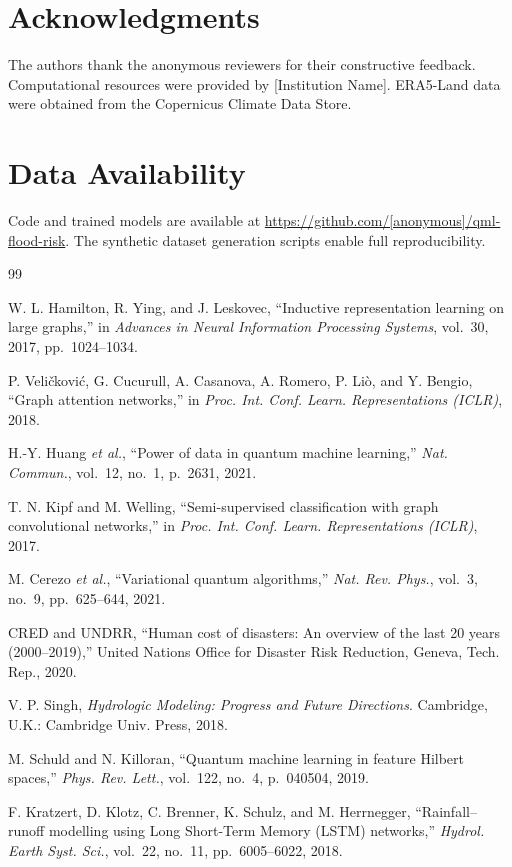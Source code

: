 \documentclass[conference]{IEEEtran}
\begin{document}
\section*{Acknowledgments}
The authors thank the anonymous reviewers for their constructive feedback. Computational resources were provided by [Institution Name]. ERA5-Land data were obtained from the Copernicus Climate Data Store.

\section*{Data Availability}
Code and trained models are available at \url{https://github.com/[anonymous]/qml-flood-risk}. The synthetic dataset generation scripts enable full reproducibility.

\begin{thebibliography}{99}

 W. L. Hamilton, R. Ying, and J. Leskovec, ``Inductive representation learning on large graphs,'' in \textit{Advances in Neural Information Processing Systems}, vol.~30, 2017, pp.~1024--1034.

 P. Veli\v{c}kovi\'{c}, G. Cucurull, A. Casanova, A. Romero, P. Li\`{o}, and Y. Bengio, ``Graph attention networks,'' in \textit{Proc. Int. Conf. Learn. Representations (ICLR)}, 2018.

 H.-Y. Huang \textit{et al.}, ``Power of data in quantum machine learning,'' \textit{Nat. Commun.}, vol.~12, no.~1, p.~2631, 2021.

 T. N. Kipf and M. Welling, ``Semi-supervised classification with graph convolutional networks,'' in \textit{Proc. Int. Conf. Learn. Representations (ICLR)}, 2017.

 M. Cerezo \textit{et al.}, ``Variational quantum algorithms,'' \textit{Nat. Rev. Phys.}, vol.~3, no.~9, pp.~625--644, 2021.

 CRED and UNDRR, ``Human cost of disasters: An overview of the last 20 years (2000--2019),'' United Nations Office for Disaster Risk Reduction, Geneva, Tech. Rep., 2020.

 V. P. Singh, \textit{Hydrologic Modeling: Progress and Future Directions}. Cambridge, U.K.: Cambridge Univ. Press, 2018.

 M. Schuld and N. Killoran, ``Quantum machine learning in feature Hilbert spaces,'' \textit{Phys. Rev. Lett.}, vol.~122, no.~4, p.~040504, 2019.

 F. Kratzert, D. Klotz, C. Brenner, K. Schulz, and M. Herrnegger, ``Rainfall--runoff modelling using Long Short-Term Memory (LSTM) networks,'' \textit{Hydrol. Earth Syst. Sci.}, vol.~22, no.~11, pp.~6005--6022, 2018.


\end{thebibliography}
\end{document}
